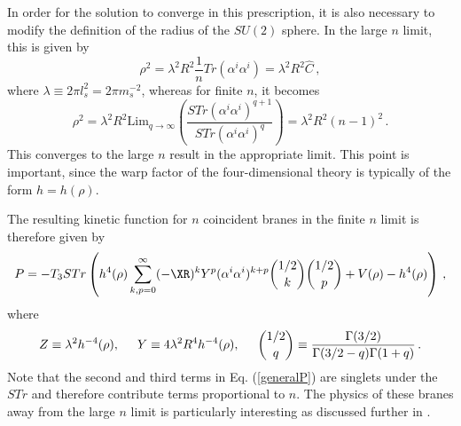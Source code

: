 In order for the solution to converge in this prescription, 
it is also necessary to modify the definition of the radius of the 
$SU(2)$ sphere. In the large $n$ limit, this is given by
\begin{equation}
\rho^2 = \lambda^2 R^2 \frac{1}{n} Tr(\alpha^i \alpha^i) = \lambda^2 R^2
\hat{C} \,,
\end{equation}
where $\lambda \equiv 2\pi l_s^2 = 2\pi m_s^{-2}$, 
whereas for finite $n$, it becomes
\begin{equation}
\rho^2 = \lambda^2 R^2 \mathrm{Lim}_{q \to \infty} \left(\frac{STr (\alpha^i
\alpha^i)^{q+1}}{STr(\alpha^i \alpha^i)^q} \right) 
= \lambda^2 R^2 (n-1)^2 \,.
\end{equation}
This converges to the large $n$ result in the appropriate limit.
This point is important, since the warp factor 
of the four-dimensional theory is typically of the form $h= h(\rho)$.

The resulting kinetic function for $n$ coincident branes in 
the finite $n$ limit is therefore given by
\begin{equation}
\label{generalP}
P = -T_3 STr \left(h^4(\rho) \sum_{k,p=0}^{\infty}(-\XR)^k Y^p (\alpha^i
\alpha^i)^{k+p}{1/2 \choose k} {1/2 \choose p} + V(\rho)
-
h^4(\rho) \right) \,,
\end{equation}
where 
\begin{equation}

Z \equiv \lambda^2 h^{-4}(\rho), \hspace{0.5cm} Y \equiv 4\lambda^2 R^4
h^{-4}(\rho),
\hspace{0.5cm} {1/2 \choose q}
\equiv \frac{\Gamma(3/2)}{\Gamma(3/2-q)\Gamma(1+q)} \,.
\end{equation}
Note that the second and third terms in Eq. (\ref{generalP}) 
are singlets under the $STr$ and therefore contribute terms proportional 
to $n$. The physics of these branes away from the large $n$ limit is particularly interesting as
discussed further
in \cite{thomasward, Ward:2007gs}.


